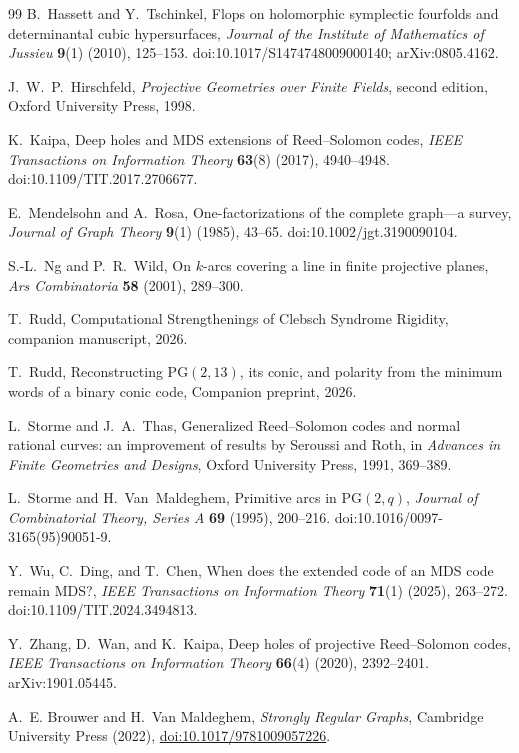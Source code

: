 \documentclass[11pt]{article}
\theoremstyle{definition}
\theoremstyle{remark}
\newcommand{\PG}{\mathrm{PG}}
\begin{document}
\begin{thebibliography}{99}
B.~Hassett and Y.~Tschinkel,
\newblock Flops on holomorphic symplectic fourfolds and determinantal cubic
hypersurfaces,
\newblock \emph{Journal of the Institute of Mathematics of Jussieu}
\textbf{9}(1) (2010), 125--153.
\newblock doi:10.1017/S1474748009000140; arXiv:0805.4162.

J.~W.~P.~Hirschfeld,
\newblock \emph{Projective Geometries over Finite Fields}, second edition,
\newblock Oxford University Press, 1998.

K.~Kaipa,
\newblock Deep holes and MDS extensions of Reed--Solomon codes,
\newblock \emph{IEEE Transactions on Information Theory} \textbf{63}(8)
(2017), 4940--4948.
\newblock doi:10.1109/TIT.2017.2706677.

E.~Mendelsohn and A.~Rosa,
\newblock One-factorizations of the complete graph---a survey,
\newblock \emph{Journal of Graph Theory} \textbf{9}(1) (1985), 43--65.
\newblock doi:10.1002/jgt.3190090104.

S.-L.~Ng and P.~R.~Wild,
\newblock On $k$-arcs covering a line in finite projective planes,
\newblock \emph{Ars Combinatoria} \textbf{58} (2001), 289--300.

T.~Rudd,
\newblock Computational Strengthenings of Clebsch Syndrome Rigidity,
\newblock companion manuscript, 2026.

T.~Rudd,
\newblock Reconstructing $\PG(2,13)$, its conic, and polarity from the minimum words of a binary conic code,
\newblock Companion preprint, 2026.

L.~Storme and J.~A.~Thas,
\newblock Generalized Reed--Solomon codes and normal rational curves: an
improvement of results by Seroussi and Roth,
\newblock in \emph{Advances in Finite Geometries and Designs}, Oxford
University Press, 1991, 369--389.

L.~Storme and H.~Van~Maldeghem,
\newblock Primitive arcs in $\PG(2,q)$,
\newblock \emph{Journal of Combinatorial Theory, Series A} \textbf{69}
(1995), 200--216.
\newblock doi:10.1016/0097-3165(95)90051-9.

Y.~Wu, C.~Ding, and T.~Chen,
\newblock When does the extended code of an MDS code remain MDS?,
\newblock \emph{IEEE Transactions on Information Theory} \textbf{71}(1)
(2025), 263--272.
\newblock doi:10.1109/TIT.2024.3494813.

Y.~Zhang, D.~Wan, and K.~Kaipa,
\newblock Deep holes of projective Reed--Solomon codes,
\newblock \emph{IEEE Transactions on Information Theory} \textbf{66}(4)
(2020), 2392--2401.
\newblock arXiv:1901.05445.

A.~E. Brouwer and H.~Van Maldeghem,
\emph{Strongly Regular Graphs},
Cambridge University Press (2022),
\href{https://doi.org/10.1017/9781009057226}{doi:10.1017/9781009057226}.

\end{thebibliography}
\end{document}
